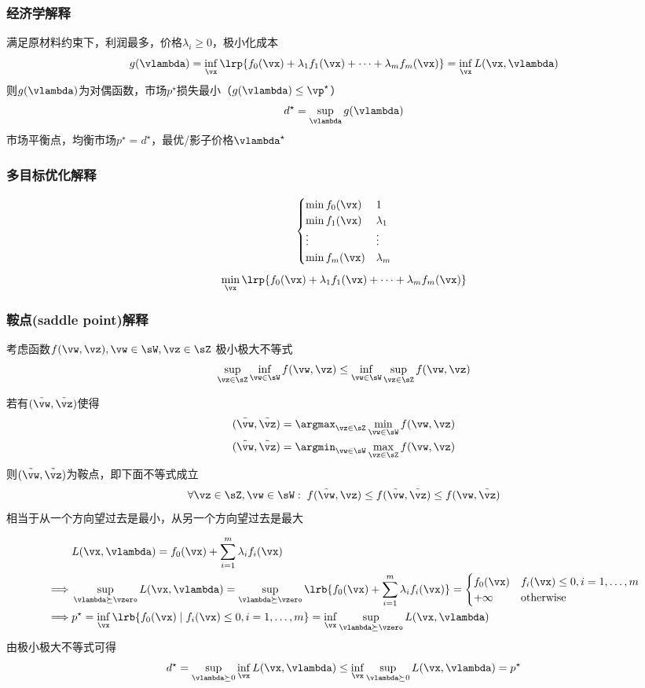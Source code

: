 \subsubsection{经济学解释}
满足原材料约束下，利润最多，价格$\lambda_i\geq 0$，极小化成本
\[g(\vlambda)=\inf_\vx \lrp{f_0(\vx)+\lambda_1 f_1(\vx)+\cdots+\lambda_m f_m(\vx)}=\inf_\vx L(\vx,\vlambda)\]
则$g(\vlambda)$为对偶函数，市场$p^\star$损失最小（$g(\vlambda)\leq \vp^\star$）
\[d^\star=\sup_{\vlambda}g(\vlambda)\]
市场平衡点，均衡市场$p^\star=d^\star$，最优/影子价格$\vlambda^\star$

\subsubsection{多目标优化解释}
\[\begin{cases}
    \min f_0(\vx) & 1\\
    \min f_1(\vx) & \lambda_1\\
    \vdots & \vdots\\
    \min f_m(\vx) & \lambda_m
\end{cases}\]
\[\min_\vx \lrp{f_0(\vx)+\lambda_1 f_1(\vx)+\cdots+\lambda_m f_m(\vx)}\]

\subsubsection{鞍点(saddle point)解释}
考虑函数$f(\vw,\vz),\vw\in \sW,\vz\in \sZ$
极小极大不等式
\[\sup_{\vz\in \sZ}\inf_{\vw\in \sW} f(\vw,\vz)\leq \inf_{\vw\in \sW}\sup_{\vz\in \sZ}f(\vw,\vz)\]
\begin{definition}[鞍点]
若有$(\tilde{\vw},\tilde{\vz})$使得
\[\begin{aligned}
    (\tilde{\vw},\tilde{\vz})&=\argmax_{\vz\in \sZ}\min_{\vw\in \sW} f(\vw,\vz)\\
    (\tilde{\vw},\tilde{\vz})&=\argmin_{\vw\in \sW}\max_{\vz\in \sZ} f(\vw,\vz)
\end{aligned}\]
则$(\tilde{\vw},\tilde{\vz})$为鞍点，即下面不等式成立
\[\forall \vz\in \sZ,\vw\in \sW:\;f(\tilde{\vw},\vz)\leq f(\tilde{\vw},\tilde{\vz})\leq f(\vw,\tilde{\vz})\]
相当于从一个方向望过去是最小，从另一个方向望过去是最大
\end{definition}

\[\begin{aligned}
    \qquad & L(\vx,\vlambda)=f_0(\vx)+\sum_{i=1}^m\lambda_i f_i(\vx)\\
    \implies& \sup_{\vlambda\succeq \vzero}L(\vx,\vlambda)=\sup_{\vlambda\succeq \vzero}\lrb{f_0(\vx)+\sum_{i=1}^m\lambda_if_i(\vx)}=
    \begin{cases}f_0(\vx)&f_i(\vx)\leq 0,i=1,\ldots,m\\+\infty&\text{otherwise}\end{cases}\\
    \implies& p^\star =\inf_\vx\lrb{f_0(\vx)\mid f_i(\vx)\leq 0,i=1,\ldots,m}=\inf_\vx\sup_{\vlambda\succeq \vzero}L(\vx,\vlambda)
\end{aligned}\]
由极小极大不等式可得
\[d^\star=\sup_{\vlambda\succeq 0}\inf_\vx L(\vx,\vlambda)\leq\inf_\vx\sup_{\vlambda\succeq 0}L(\vx,\vlambda)=p^\star\]

